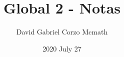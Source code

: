 \documentclass[openany]{book}
\title{Global 2 - Notas}
\date{2020 July 27}
\author{David Gabriel Corzo Mcmath}
\begin{document}
\maketitle

\chapter{}


\end{document}
